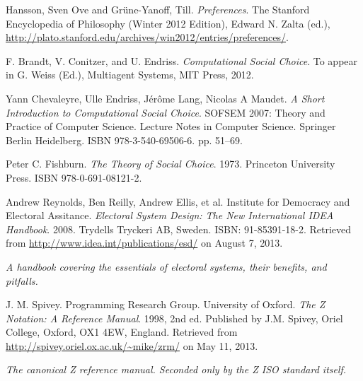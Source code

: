 
\begin{thebibliography}{9} %


Hansson, Sven Ove and Grüne-Yanoff, Till. \emph{Preferences}. The Stanford
Encyclopedia of Philosophy (Winter 2012 Edition), Edward N. Zalta (ed.),
\url{http://plato.stanford.edu/archives/win2012/entries/preferences/}.


F. Brandt, V. Conitzer, and U. Endriss. \emph{Computational Social Choice}. To
appear in G. Weiss (Ed.), Multiagent Systems, MIT Press, 2012.


Yann Chevaleyre, Ulle Endriss, Jérôme Lang, Nicolas A Maudet. \emph{A Short
Introduction to Computational Social Choice}. SOFSEM 2007: Theory and Practice
of Computer Science. Lecture Notes in Computer Science. Springer Berlin
Heidelberg. ISBN 978-3-540-69506-6. pp. 51--69.


Peter C. Fishburn. \emph{The Theory of Social Choice}. 1973. Princeton
University Press. ISBN 978-0-691-08121-2.


Andrew Reynolds, Ben Reilly, Andrew Ellis, et al. Institute for Democracy and
Electoral Assitance. \emph{Electoral System Design: The New International IDEA
Handbook}. 2008. Trydells Tryckeri AB, Sweden. ISBN: 91-85391-18-2. Retrieved
from \url{http://www.idea.int/publications/esd/} on August 7, 2013.

\emph{A handbook covering the essentials of electoral systems, their benefits,
and pitfalls.}


J. M. Spivey. Programming Research Group. University of Oxford. \emph{The Z
Notation: A Reference Manual}. 1998, 2nd ed. Published by J.M. Spivey, Oriel
College, Oxford, OX1 4EW, England. Retrieved from
\url{http://spivey.oriel.ox.ac.uk/~mike/zrm/} on May 11, 2013.

\emph{The canonical Z reference manual. Seconded only by the Z ISO standard
itself.}

\end{thebibliography}

